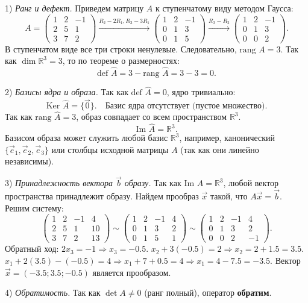 \documentclass[12pt,a4paper]{article}
\theoremstyle{plain}
\theoremstyle{definition}
\begin{document}
\begin{solbox}
    1) \textit{Ранг и дефект.}
    Приведем матрицу $A$ к ступенчатому виду методом Гаусса:
    \[
    A = \begin{pmatrix} 1 & 2 & -1 \\ 2 & 5 & 1 \\ 3 & 7 & 2 \end{pmatrix} \xrightarrow{R_2-2R_1, R_3-3R_1} \begin{pmatrix} 1 & 2 & -1 \\ 0 & 1 & 3 \\ 0 & 1 & 5 \end{pmatrix} \xrightarrow{R_3-R_2} \begin{pmatrix} 1 & 2 & -1 \\ 0 & 1 & 3 \\ 0 & 0 & 2 \end{pmatrix}.
    \]
    В ступенчатом виде все три строки ненулевые. Следовательно, $\text{rang } A = 3$.
    Так как $\dim \mathbb{R}^3 = 3$, то по теореме о размерностях:
    \[
    \text{def } \hat{A} = 3 - \text{rang } \hat{A} = 3 - 3 = 0.
    \]

    2) \textit{Базисы ядра и образа.}
    Так как $\text{def } \hat{A} = 0$, ядро тривиально:
    \[
    \text{Ker } \hat{A} = \{ \vec{0} \}. \quad \text{Базис ядра отсутствует (пустое множество)}.
    \]
    Так как $\text{rang } \hat{A} = 3$, образ совпадает со всем пространством $\mathbb{R}^3$.
    \[
    \text{Im } \hat{A} = \mathbb{R}^3.
    \]
    Базисом образа может служить любой базис $\mathbb{R}^3$, например, канонический $\{\vec{e}_1, \vec{e}_2, \vec{e}_3\}$ или столбцы исходной матрицы $A$ (так как они линейно независимы).

    3) \textit{Принадлежность вектора $\vec{b}$ образу.}
    Так как $\text{Im } \hat{A} = \mathbb{R}^3$, любой вектор пространства принадлежит образу. Найдем прообраз $\vec{x}$ такой, что $A\vec{x} = \vec{b}$.
    Решим систему:
    \[
    \left(\begin{array}{ccc|c} 1 & 2 & -1 & 4 \\ 2 & 5 & 1 & 10 \\ 3 & 7 & 2 & 13 \end{array}\right) \sim \left(\begin{array}{ccc|c} 1 & 2 & -1 & 4 \\ 0 & 1 & 3 & 2 \\ 0 & 1 & 5 & 1 \end{array}\right) \sim \left(\begin{array}{ccc|c} 1 & 2 & -1 & 4 \\ 0 & 1 & 3 & 2 \\ 0 & 0 & 2 & -1 \end{array}\right).
    \]
    Обратный ход:
    $2x_3 = -1 \Rightarrow x_3 = -0.5$.
    $x_2 + 3(-0.5) = 2 \Rightarrow x_2 = 2 + 1.5 = 3.5$.
    $x_1 + 2(3.5) - (-0.5) = 4 \Rightarrow x_1 + 7 + 0.5 = 4 \Rightarrow x_1 = 4 - 7.5 = -3.5$.
    Вектор $\vec{x} = (-3.5; 3.5; -0.5)$ является прообразом.

    4) \textit{Обратимость.}
    Так как $\det A \neq 0$ (ранг полный), оператор \textbf{обратим}.
\end{solbox}
\end{document}
